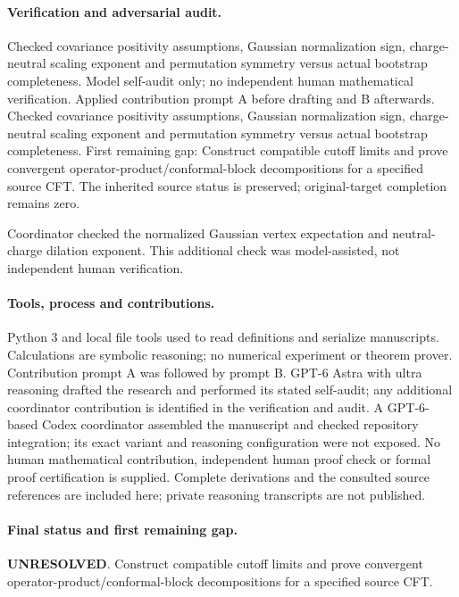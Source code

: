 \documentclass[11pt]{article}
\begin{document}
\paragraph{Verification and adversarial audit.}
Checked covariance positivity assumptions, Gaussian normalization sign, charge-neutral scaling exponent and permutation symmetry versus actual bootstrap completeness. Model self-audit only; no independent human mathematical verification. Applied contribution prompt A before drafting and B afterwards. Checked covariance positivity assumptions, Gaussian normalization sign, charge-neutral scaling exponent and permutation symmetry versus actual bootstrap completeness. First remaining gap: Construct compatible cutoff limits and prove convergent operator-product/conformal-block decompositions for a specified source CFT. The inherited source status is preserved; original-target completion remains zero.

Coordinator checked the normalized Gaussian vertex expectation and neutral-charge dilation exponent. This additional check was model-assisted, not independent human verification.

\paragraph{Tools, process and contributions.}
Python 3 and local file tools used to read definitions and serialize manuscripts. Calculations are symbolic reasoning; no numerical experiment or theorem prover. Contribution prompt A was followed by prompt B. GPT-6 Astra with ultra reasoning drafted the research and performed its stated self-audit; any additional coordinator contribution is identified in the verification and audit. A GPT-6-based Codex coordinator assembled the manuscript and checked repository integration; its exact variant and reasoning configuration were not exposed. No human mathematical contribution, independent human proof check or formal proof certification is supplied. Complete derivations and the consulted source references are included here; private reasoning transcripts are not published.

\paragraph{Final status and first remaining gap.}
\textbf{UNRESOLVED}. Construct compatible cutoff limits and prove convergent operator-product/conformal-block decompositions for a specified source CFT.
\end{document}
